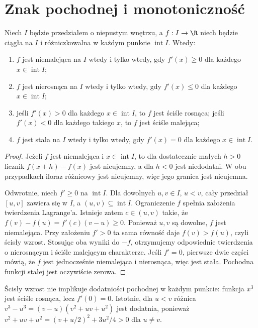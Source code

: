 \section{Znak pochodnej i monotoniczność}
\begin{twierdzenie}
\label{ma1:thm:derivative-monotonicity}
Niech $I$ będzie przedziałem o niepustym wnętrzu, a $f:I\to\R$ niech będzie ciągła na $I$ i różniczkowalna w każdym punkcie $\operatorname{int}I$. Wtedy:
\begin{enumerate}
 \item $f$ jest niemalejąca na $I$ wtedy i tylko wtedy, gdy $f'(x)\ge0$ dla każdego $x\in\operatorname{int}I$;
 \item $f$ jest nierosnąca na $I$ wtedy i tylko wtedy, gdy $f'(x)\le0$ dla każdego $x\in\operatorname{int}I$;
 \item jeśli $f'(x)>0$ dla każdego $x\in\operatorname{int}I$, to $f$ jest ściśle rosnąca; jeśli $f'(x)<0$ dla każdego takiego $x$, to $f$ jest ściśle malejąca;
 \item $f$ jest stała na $I$ wtedy i tylko wtedy, gdy $f'(x)=0$ dla każdego $x\in\operatorname{int}I$.
\end{enumerate}
\end{twierdzenie}
\begin{proof}
Jeżeli $f$ jest niemalejąca i $x\in\operatorname{int}I$, to dla dostatecznie małych $h>0$ licznik $f(x+h)-f(x)$ jest nieujemny, a dla $h<0$ jest niedodatni. W obu przypadkach iloraz różnicowy jest nieujemny, więc jego granica jest nieujemna.

Odwrotnie, niech $f'\ge0$ na $\operatorname{int}I$. Dla dowolnych $u,v\in I$, $u<v$, cały przedział $[u,v]$ zawiera się w $I$, a $(u,v)\subseteq\operatorname{int}I$. Ograniczenie $f$ spełnia założenia twierdzenia Lagrange'a. Istnieje zatem $c\in(u,v)$ takie, że $f(v)-f(u)=f'(c)(v-u)\ge0$. Ponieważ $u,v$ są dowolne, $f$ jest niemalejąca. Przy założeniu $f'>0$ ta sama równość daje $f(v)>f(u)$, czyli ścisły wzrost. Stosując oba wyniki do $-f$, otrzymujemy odpowiednie twierdzenia o nierosnącym i ściśle malejącym charakterze. Jeśli $f'=0$, pierwsze dwie części mówią, że $f$ jest jednocześnie niemalejąca i nierosnąca, więc jest stała. Pochodna funkcji stałej jest oczywiście zerowa.
\end{proof}
Ścisły wzrost nie implikuje dodatniości pochodnej w każdym punkcie: funkcja $x^3$ jest ściśle rosnąca, lecz $f'(0)=0$. Istotnie, dla $u<v$ różnica $v^3-u^3=(v-u)(v^2+uv+u^2)$ jest dodatnia, ponieważ $v^2+uv+u^2=(v+u/2)^2+3u^2/4>0$ dla $u\ne v$.

